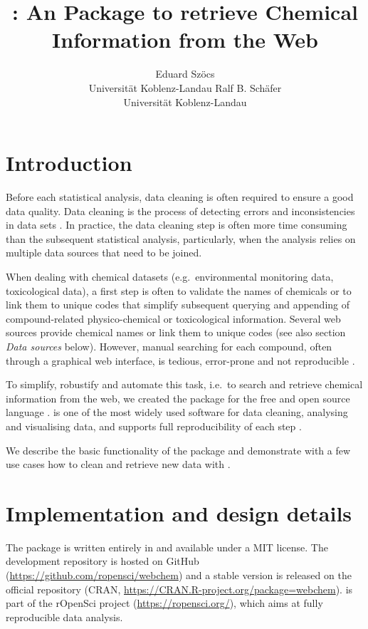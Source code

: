 \documentclass[article, shortnames]{jss}\usepackage[]{graphicx}\usepackage[]{color}
\author{Eduard Sz\"ocs\\Universit\"at Koblenz-Landau \And 
        Ralf B. Sch\"afer\\Universit\"at Koblenz-Landau}
\title{\pkg{webchem}: An \proglang{R} Package to retrieve Chemical Information from the Web}
\providecommand{\DIFaddbegin}{} %
\providecommand{\DIFaddend}{} %
\providecommand{\DIFdelbegin}{} %
\providecommand{\DIFdelend}{} %
\begin{document}
\section[Introduction]{Introduction}
Before each statistical analysis, data cleaning is often required to ensure a good data quality.
Data cleaning is the process of detecting errors and inconsistencies in data sets \citep{Chapman_2005}.
In practice, the data cleaning step is often more time consuming than the subsequent statistical analysis, particularly, when the analysis relies on multiple data sources that need to be joined.

When dealing with chemical datasets (e.g.\DIFaddbegin \ \DIFaddend environmental monitoring data, toxicological data), a first step is often to validate the names of chemicals or to link them to unique codes that simplify subsequent querying and appending of compound-related physico-chemical or toxicological information.
Several web sources provide chemical names or link them to unique codes (see also section \emph{Data sources} below).
However, manual searching for each compound, often through a graphical web interface, is tedious, error-prone and not reproducible \citep{Peng_2009}.

To simplify, robustify and automate this task, i.e.\DIFaddbegin \ \DIFaddend to search and retrieve chemical information from the web, we created the  package for the free and open source  language \citep{r_2015, Wehrens_2011}.
 is one of the most widely used software for data cleaning, analysing and visualising data, and supports full reproducibility of each step \citep{Marwick_2016}.

We describe the basic functionality of the package and demonstrate with a few use cases how to clean and retrieve new data with .


\section[Implementation and design details]{Implementation and design details}
The  package is written entirely in  and available under a MIT license.
The development repository is hosted on GitHub (\url{https://github.com/ropensci/webchem}) and a stable version is released on the official  repository (CRAN, \DIFdelbegin %
\DIFdelend \DIFaddbegin \url{https://CRAN.R-project.org/package=webchem}\DIFaddend ).
 is part of the rOpenSci project (\url{https://ropensci.org/}), which aims at fully reproducible data analysis.
\end{document}
